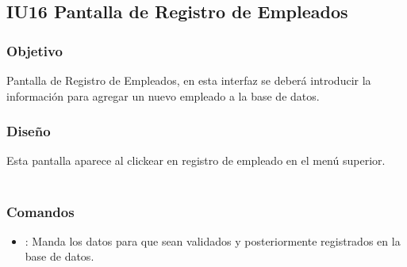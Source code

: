 \newpage
\subsection{IU16 Pantalla de Registro de Empleados}

\subsubsection{Objetivo}
	Pantalla de Registro de Empleados, en esta interfaz se deberá introducir la información para agregar un nuevo empleado a la base de datos.  

\subsubsection{Diseño}
	Esta pantalla aparece al clickear en registro de empleado en el menú superior.  \\\\


\subsubsection{Comandos}
\begin{itemize}
	\item {}: Manda los datos para que sean validados y posteriormente registrados en la base de datos. 
\end{itemize}


